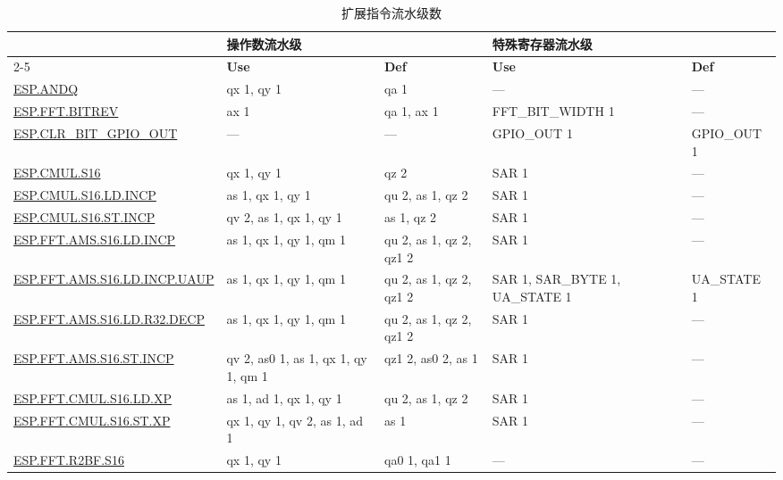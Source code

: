 
\begin{longtable}[c]{|l|m{2.5cm}|m{2.5cm}|m{2.5cm}|m{2.5cm}|}
    \caption{扩展指令流水级数}
    \label{tab:pie_inst_pipelining}\\
    \hline
    \rowcolor{lightgray}
     & \multicolumn{2}{l|}{\textbf{操作数流水级}} & \multicolumn{2}{l|}{\textbf{特殊寄存器流水级}} \\\cline{2-5}
    \rowcolor{lightgray}
    \multirow{-2}{1in}{\textbf{指令}} & \textbf{Use} & \textbf{Def} & \textbf{Use} & \textbf{Def} \\\hline
    \hyperref[instruction:ESPANDQ]{ESP.ANDQ} & qx 1, qy 1 & qa 1 & — & — \\\hline
    \hyperref[instruction:ESPFFTBITREV]{ESP.FFT.BITREV} & ax 1 & qa 1, ax 1 & FFT\_BIT\_WIDTH 1 & — \\\hline
    \hyperref[instruction:ESPCLRBITGPIOOUT]{ESP.CLR\_BIT\_GPIO\_OUT} & — & — & GPIO\_OUT 1 & GPIO\_OUT 1 \\\hline
    \hyperref[instruction:ESPCMULS16]{ESP.CMUL.S16} & qx 1, qy 1 & qz 2 & SAR 1 & — \\\hline
    \hyperref[instruction:ESPCMULS16LDINCP]{ESP.CMUL.S16.LD.INCP} & as 1, qx 1, qy 1 & qu 2, as 1, qz 2 & SAR 1 & — \\\hline
    \hyperref[instruction:ESPCMULS16STINCP]{ESP.CMUL.S16.ST.INCP} & qv 2, as 1, qx 1, qy 1 & as 1, qz 2 & SAR 1 & — \\\hline
    \hyperref[instruction:ESPFFTAMSS16LDINCP]{ESP.FFT.AMS.S16.LD.INCP} & as 1, qx 1, qy 1, qm 1 & qu 2, as 1, qz 2, qz1 2 & SAR 1 & — \\\hline
    \hyperref[instruction:ESPFFTAMSS16LDINCPUAUP]{ESP.FFT.AMS.S16.LD.INCP.UAUP} & as 1, qx 1, qy 1, qm 1 & qu 2, as 1, qz 2, qz1 2 & SAR 1, SAR\_BYTE 1, UA\_STATE 1 & UA\_STATE 1\\\hline
    \hyperref[instruction:ESPFFTAMSS16LDR32DECP]{ESP.FFT.AMS.S16.LD.R32.DECP} & as 1, qx 1, qy 1, qm 1 & qu 2, as 1, qz 2, qz1 2 & SAR 1 & — \\\hline
    \hyperref[instruction:ESPFFTAMSS16STINCP]{ESP.FFT.AMS.S16.ST.INCP} & qv 2, as0 1, as 1, qx 1, qy 1, qm 1 & qz1 2, as0 2, as 1 & SAR 1 & — \\\hline
    \hyperref[instruction:ESPFFTCMULS16LDXP]{ESP.FFT.CMUL.S16.LD.XP} & as 1, ad 1, qx 1, qy 1 & qu 2, as 1, qz 2 & SAR 1 & — \\\hline
    \hyperref[instruction:ESPFFTCMULS16STXP]{ESP.FFT.CMUL.S16.ST.XP} & qx 1, qy 1, qv 2, as 1, ad 1 & as 1 & SAR 1 & — \\\hline
    \hyperref[instruction:ESPFFTR2BFS16]{ESP.FFT.R2BF.S16} & qx 1, qy 1 & qa0 1, qa1 1 & — & — \\\hline

\end{longtable}

